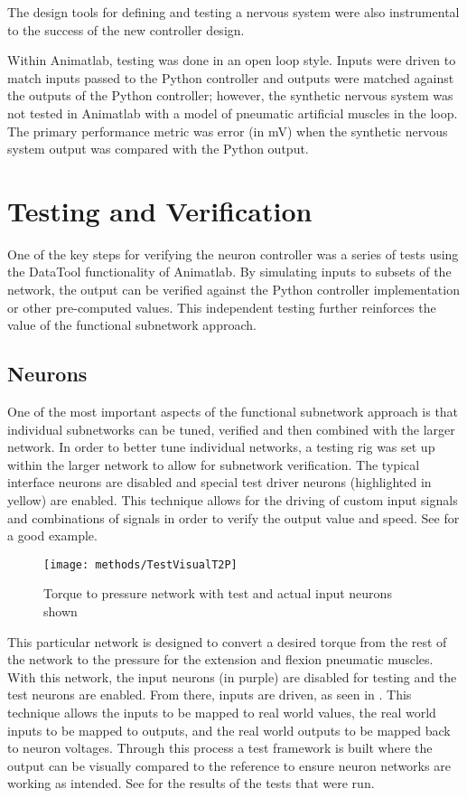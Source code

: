 The design tools for defining and testing a nervous system were also instrumental
to the success of the new controller design.

Within Animatlab, testing was done in an open loop style. Inputs were driven to match inputs passed to the Python controller and outputs were matched against the outputs of the Python controller; however, the synthetic nervous system was not tested in Animatlab with a model of pneumatic artificial muscles in the loop. The primary performance metric was error (in mV) when the synthetic nervous system output was compared with the Python output.

\section{Testing and Verification}

One of the key steps for verifying the neuron controller was a series of tests
using the DataTool functionality of Animatlab. By simulating inputs to subsets
of the network, the output can be verified against the Python controller
implementation or other pre-computed values. This independent testing further
reinforces the value of the functional subnetwork approach.

\subsection{Neurons}

One of the most important aspects of the functional subnetwork approach is that
individual subnetworks can be tuned, verified and then combined with the larger
network. In order to better tune individual networks, a testing rig was set up
within the larger network to allow for subnetwork verification. The typical
interface neurons are disabled and special test driver neurons (highlighted in
yellow) are enabled. This technique allows for the driving of custom input signals and
combinations of signals in order to verify the output value and speed. 
See  for a good example.

\begin{figure}
\centering
\texttt{[image: methods/TestVisualT2P]}
\caption{Torque to pressure network with test and actual input neurons shown}
\label{fig:TestNetworkT2P}
\end{figure}

This particular network is designed to convert a desired torque from the rest
of the network to the pressure for the extension and flexion pneumatic muscles.
With this network, the input neurons (in purple)
are disabled for testing and the test neurons are enabled. From there, inputs
are driven, as seen in . This technique allows the inputs to 
be mapped to real world values, the real world inputs to be mapped to outputs, 
and the real world outputs to be mapped back to neuron voltages. Through this
process a test framework is built where the output can be visually compared to the 
reference to ensure neuron networks are working as intended. See 
 for the results of the tests that were run.

